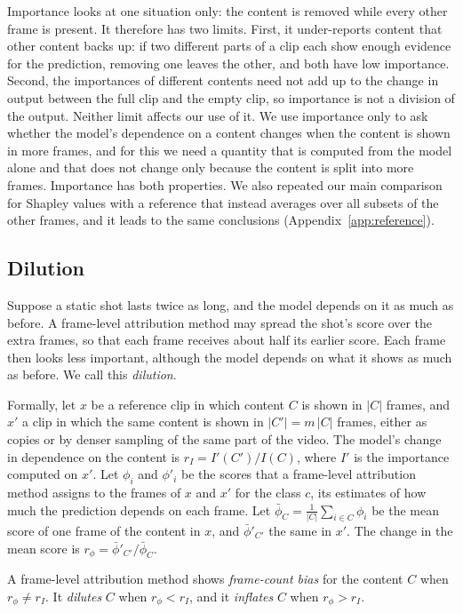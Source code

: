 Importance looks at one situation only: the content is removed while every other frame is present.
It therefore has two limits.
First, it under-reports content that other content backs up: if two different parts of a clip each show enough evidence for the prediction, removing one leaves the other, and both have low importance.
Second, the importances of different contents need not add up to the change in output between the full clip and the empty clip, so importance is not a division of the output.
Neither limit affects our use of it.
We use importance only to ask whether the model's dependence on a content changes when the content is shown in more frames, and for this we need a quantity that is computed from the model alone and that does not change only because the content is split into more frames.
Importance has both properties.
We also repeated our main comparison for Shapley values with a reference that instead averages over all subsets of the other frames, and it leads to the same conclusions (Appendix~\ref{app:reference}).

\subsection{Dilution}
\label{sec:attr-requirements}

Suppose a static shot lasts twice as long, and the model depends on it as much as before.
A frame-level attribution method may spread the shot's score over the extra frames, so that each frame receives about half its earlier score.
Each frame then looks less important, although the model depends on what it shows as much as before.
We call this \emph{dilution}.

Formally, let $x$ be a reference clip in which content $C$ is shown in $|C|$ frames, and $x'$ a clip in which the same content is shown in $|C'| = m\,|C|$ frames, either as copies or by denser sampling of the same part of the video.
The model's change in dependence on the content is $r_I = I'(C') / I(C)$, where $I'$ is the importance computed on $x'$.
Let $\phi_i$ and $\phi'_i$ be the scores that a frame-level attribution method assigns to the frames of $x$ and $x'$ for the class $c$, its estimates of how much the prediction depends on each frame.
Let $\bar\phi_C = \frac{1}{|C|}\sum_{i \in C} \phi_i$ be the mean score of one frame of the content in $x$, and $\bar\phi'_{C'}$ the same in $x'$.
The change in the mean score is $r_\phi = \bar\phi'_{C'} / \bar\phi_C$.

\begin{definition}
\label{def:dilution}
A frame-level attribution method shows \emph{frame-count bias} for the content $C$ when $r_\phi \ne r_I$.
It \emph{dilutes} $C$ when $r_\phi < r_I$, and it \emph{inflates} $C$ when $r_\phi > r_I$.
\end{definition}

